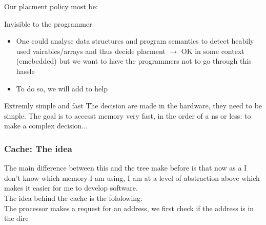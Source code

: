 \begin{parag}{Our placment policy most be:}
    \begin{subparag}{Invisible to the programmer}
        \begin{itemize}
            \item One could analyse data structures and program semantics to detect heabily used vairables/arrays and thus decide placment $\to$ OK in some context (emebedded) but we want to have the programmers not to go through this hassle 
            \item To do so, we will add  to help
        \end{itemize}
    \end{subparag}
	\begin{subparag}{Extremly simple and fast}
		The decision are made in the hardware, they need to be simple. The goal is to accesst memory very fast, in the order of a ns or less:   to make a complex decision...
	\end{subparag}
\end{parag}


\subsubsection{Cache: The idea}
The main difference between this and the tree make before is that now as a  I don't know which memory I am using, I am at a level of abstraction above which makes it easier for me to develop software.\\
The idea behind the cache is the fololowing:\\
The processor makes a request for an address, we first check if the address is in the dirc


